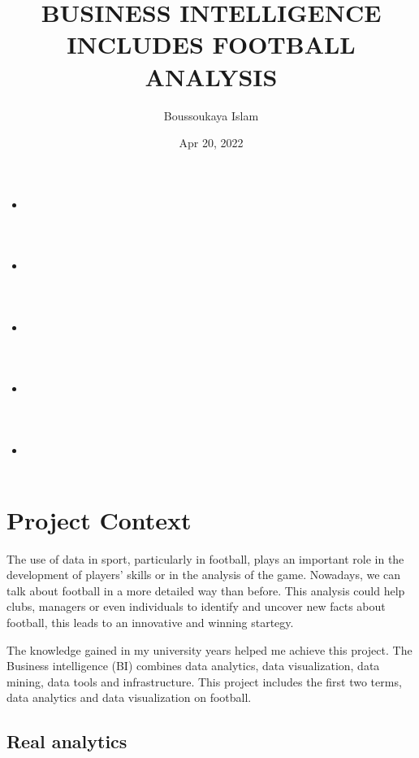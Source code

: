 \documentclass[letterpaper,10pt,english]{jupyterBook}
\title{BUSINESS INTELLIGENCE INCLUDES FOOTBALL ANALYSIS}
\date{Apr 20, 2022}
\author{Boussoukaya Islam}
\begin{document}
\pagestyle{empty}
\sphinxmaketitle
\pagestyle{plain}
\sphinxtableofcontents
\pagestyle{normal}
\label{\detokenize{intro::doc}}



\begin{itemize}
\item {} 
\sphinxAtStartPar
{\hyperref[\detokenize{Introduction/introduction::doc}]{}}

\item {} 
\sphinxAtStartPar
{\hyperref[\detokenize{Chap1/Chap1::doc}]{}}

\item {} 
\sphinxAtStartPar
{\hyperref[\detokenize{Chap2/chap2::doc}]{}}

\item {} 
\sphinxAtStartPar
{\hyperref[\detokenize{Chap3/Chap3::doc}]{}}

\item {} 
\sphinxAtStartPar
{\hyperref[\detokenize{Conclusion/conc::doc}]{}}

\end{itemize}




\chapter{Project Context}
\label{\detokenize{Introduction/introduction:project-context}}\label{\detokenize{Introduction/introduction::doc}}
\sphinxAtStartPar
The use of data in sport, particularly in football, plays an important role in the development of players’ skills or in the analysis of the game. Nowadays, we can talk about football in a more detailed way than before.
This analysis could help clubs, managers or even individuals to identify and uncover new facts about football, this leads to an innovative and winning startegy.

\sphinxAtStartPar
The knowledge gained in my university years helped me achieve this project. The Business intelligence (BI) combines data analytics, data visualization, data mining, data tools and infrastructure. This project includes the first two terms, data analytics and data visualization on football.


\section{Real analytics}
\label{\detokenize{Introduction/introduction:real-analytics}}
\end{document}
